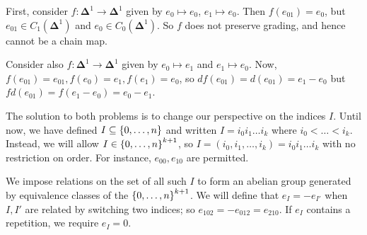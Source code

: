 First, consider \( f \colon \bm \Delta^1 \to \bm \Delta^1 \) given by \( e_0 \mapsto e_0 \), \( e_1 \mapsto e_0 \).
Then \( f(e_{01}) = e_0 \), but \( e_{01} \in C_1(\bm\Delta^1) \) and \( e_0 \in C_0(\bm\Delta^1) \).
So \( f \) does not preserve grading, and hence cannot be a chain map.

Consider also \( f \colon \bm\Delta^1 \to \bm\Delta^1 \) given by \( e_0 \mapsto e_1 \) and \( e_1 \mapsto e_0 \).
Now, \( f(e_{01}) = e_{01}, f(e_0) = e_1, f(e_1) = e_0 \), so \( df(e_{01}) = d(e_{01}) = e_1 - e_0 \) but \( fd(e_{01}) = f(e_1 - e_0) = e_0 - e_1 \).

The solution to both problems is to change our perspective on the indices \( I \).
Until now, we have defined \( I \subseteq \qty{0, \dots, n} \) and written \( I = i_0 i_1 \dots i_k \) where \( i_0 < \dots < i_k \).
Instead, we will allow \( I \in \qty{0, \dots, n}^{k+1} \), so \( I = (i_0, i_1, \dots, i_k) = i_0 i_1 \dots i_k \) with no restriction on order.
For instance, \( e_{00}, e_{10} \) are permitted.

We impose relations on the set of all such \( I \) to form an abelian group generated by equivalence classes of the \( \qty{0, \dots, n}^{k+1} \).
We will define that \( e_I = -e_{I'} \) when \( I, I' \) are related by switching two indices; so \( e_{102} = -e_{012} = e_{210} \).
If \( e_I \) contains a repetition, we require \( e_I = 0 \).

